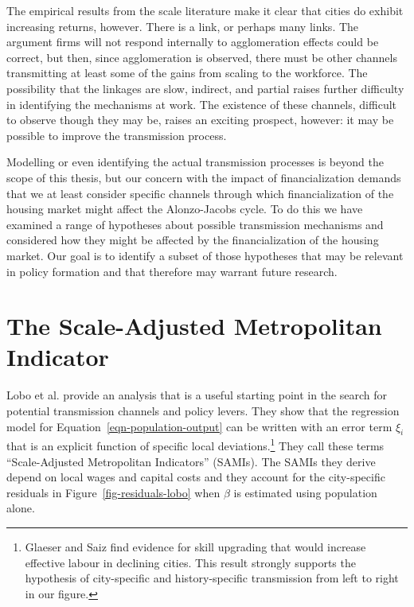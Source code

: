 
The empirical results from the scale literature  make it clear that cities do exhibit increasing returns, however. There is a link, or perhaps many links. The argument firms will not respond internally to agglomeration effects could be correct, but then, since agglomeration is observed, there must  be other channels  transmitting at least some of the gains from scaling to the workforce. The possibility that the linkages are slow, indirect, and partial raises further difficulty in identifying the mechanisms at work.  The existence of these channels, difficult to observe though they may be, raises an exciting prospect, however: it may be possible to improve the  transmission process. 


Modelling or even identifying  the actual transmission processes is beyond the scope of this thesis, but our concern with the impact of financialization demands that we at least consider specific channels through which financialization of the housing market might affect the Alonzo-Jacobs cycle. To do this we have examined a range of hypotheses about possible transmission mechanisms and considered how they might be affected by the financialization of the housing market. Our goal is to identify a subset of those hypotheses that may be relevant in policy formation and that therefore may warrant future research.



\section{The Scale-Adjusted Metropolitan Indicator}

 Lobo et al. \cite{loboUrbanScalingProduction2013} provide an  analysis that is a useful starting point in the search for potential transmission channels and policy levers. They show that the regression model for Equation~\ref{eqn-population-output} can be written with an error term $\xi_i$ that is an explicit  function of specific local deviations.\footnote{Glaeser and Saiz \cite{glaeserRiseSkilledCity2003} find %
 evidence for skill upgrading that would increase effective labour in declining cities. This result strongly  supports the hypothesis of city-specific  and history-specific transmission from left to right in our figure.}  
They  call these terms ``Scale-Adjusted Metropolitan Indicators'' (SAMIs). The SAMIs they derive depend on local wages and capital costs and they account for the city-specific residuals in Figure~\ref{fig-residuals-lobo} when $\beta$ is estimated using population alone. 
 
